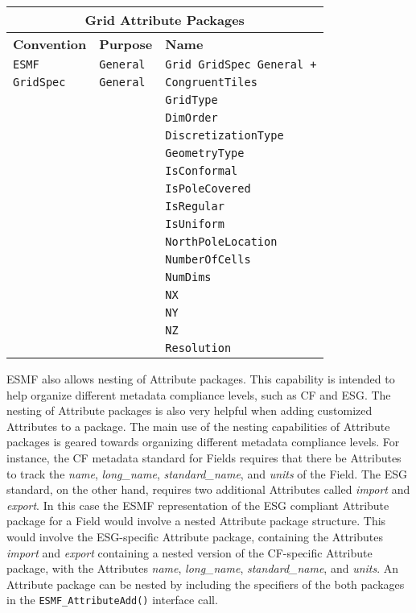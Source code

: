 \begin{tabular}{|p{4cm}|p{4cm}|p{6cm}|}
\hline
\multicolumn{3}{|c|}{{\bf \large Grid Attribute Packages}} \\
\hline\hline
{\bf Convention} & {\bf Purpose} & {\bf Name} \\
\hline\hline
{\tt ESMF} & {\tt General} & {\tt Grid GridSpec General +} \\
{\tt GridSpec} & {\tt General} & {\tt CongruentTiles} \\
 & & {\tt GridType} \\ 
 & & {\tt DimOrder} \\ 
 & & {\tt DiscretizationType} \\ 
 & & {\tt GeometryType} \\ 
 & & {\tt IsConformal} \\ 
 & & {\tt IsPoleCovered} \\ 
 & & {\tt IsRegular} \\ 
 & & {\tt IsUniform} \\ 
 & & {\tt NorthPoleLocation} \\ 
 & & {\tt NumberOfCells} \\ 
 & & {\tt NumDims} \\ 
 & & {\tt NX} \\ 
 & & {\tt NY} \\ 
 & & {\tt NZ} \\ 
 & & {\tt Resolution} \\ 
\hline
\end{tabular}
\label{GridAttributePackages}

\vspace{18pt}

\vspace{18pt}

ESMF also allows nesting of Attribute packages.  This capability is intended to help organize different metadata compliance levels, such as CF and ESG.  The nesting of Attribute packages is also very helpful when adding customized Attributes to a package.  The main use of the nesting capabilities of Attribute packages is geared towards organizing different metadata compliance levels.  For instance, the CF metadata standard for Fields requires that there be Attributes to track the {\it name}, {\it long\_name}, {\it standard\_name}, and {\it units} of the Field.  The ESG standard, on the other hand, requires two additional Attributes called {\it import} and {\it export}.  In this case the ESMF representation of the ESG compliant Attribute package for a Field would involve a nested Attribute package structure.  This would involve the ESG-specific Attribute package, containing the Attributes {\it import} and {\it export} containing a nested version of the CF-specific Attribute package, with the Attributes {\it name}, {\it long\_name}, {\it standard\_name}, and {\it units}.  An Attribute package can be nested by including the specifiers of the both packages in the {\tt ESMF\_AttributeAdd()} interface call.  

